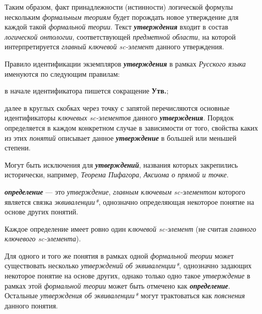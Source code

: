 Таким образом, факт принадлежности (истинности) логической формулы нескольким \textit{формальным теориям} будет порождать новое утверждение для каждой такой \textit{формальной теории}. Текст \textbf{\textit{утверждения}} входит в состав \textit{логической онтологии}, соответствующей \textit{предметной области}, на которой интерпретируется \textit{главный ключевой sc-элемент\scnrolesign} данного утверждения.

Правило идентификации экземпляров \textbf{\textit{утверждения}} в рамках \textit{Русского языка} именуются по следующим правилам:
\begin{textitemize}
	\item{в начале идентификатора пишется сокращение \textbf{Утв.};}
	\item{далее в круглых скобках через точку с запятой перечисляются основные идентификаторы \textit{ключевых \mbox{sc-элементов}\scnrolesign} данного \textbf{\textit{утверждения}}. Порядок определяется в каждом конкретном случае в зависимости от того, свойства каких из этих \textit{понятий} описывает данное \textbf{\textit{утверждение}} в большей или меньшей степени.}
\end{textitemize}

Могут быть исключения для \textbf{\textit{утверждений}}, названия которых закрепились исторически, например, \textit{Теорема Пифагора}, \textit{Аксиома о прямой и точке}.



\textbf{\textit{определение}} --- это \textit{утверждение}, \textit{главным ключевым sc-элементом\scnrolesign} которого является связка \textit{эквиваленции*}, однозначно определяющая некоторое понятие на основе других понятий.

Каждое определение имеет ровно один \textit{ключевой sc-элемент\scnrolesign} (не считая \textit{главного ключевого sc-элемента\scnrolesign}).

Для одного и того же понятия в рамках одной \textit{формальной теории} может существовать несколько \textit{утверждений об эквиваленции*}, однозначно задающих некоторое понятие на основе других, однако только одно такое \textit{утверждение} в рамках этой \textit{формальной теории} может быть отмечено как \textbf{\textit{определение}}. Остальные \textit{утверждения об эквиваленции*} могут трактоваться как \textit{пояснения} данного понятия.

